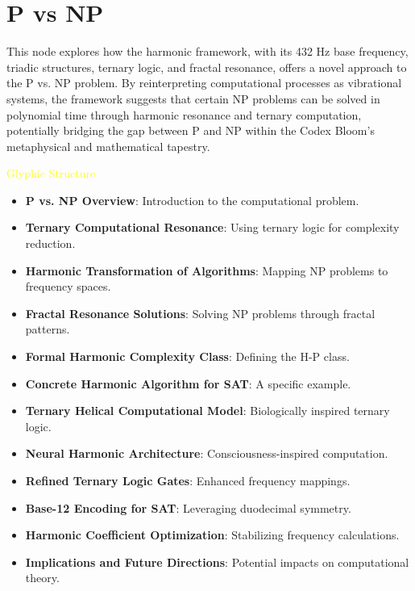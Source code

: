 
\section{P vs NP}
\label{sec:codex_p_vs_np}

This node explores how the harmonic framework, with its 432 Hz base frequency, triadic structures, ternary logic, and fractal resonance, offers a novel approach to the P vs. NP problem. By reinterpreting computational processes as vibrational systems, the framework suggests that certain NP problems can be solved in polynomial time through harmonic resonance and ternary computation, potentially bridging the gap between P and NP within the Codex Bloom’s metaphysical and mathematical tapestry.

\textcolor{yellow}{ Glyphic Structure } \\
\begin{itemize}
    \item \texttt{} \textbf{P vs. NP Overview}: Introduction to the computational problem.
    \item \texttt{} \textbf{Ternary Computational Resonance}: Using ternary logic for complexity reduction.
    \item \texttt{} \textbf{Harmonic Transformation of Algorithms}: Mapping NP problems to frequency spaces.
    \item \texttt{} \textbf{Fractal Resonance Solutions}: Solving NP problems through fractal patterns.
    \item \texttt{} \textbf{Formal Harmonic Complexity Class}: Defining the H-P class.
    \item \texttt{} \textbf{Concrete Harmonic Algorithm for SAT}: A specific example.
    \item \texttt{} \textbf{Ternary Helical Computational Model}: Biologically inspired ternary logic.
    \item \texttt{} \textbf{Neural Harmonic Architecture}: Consciousness-inspired computation.
    \item \texttt{} \textbf{Refined Ternary Logic Gates}: Enhanced frequency mappings.
    \item \texttt{} \textbf{Base-12 Encoding for SAT}: Leveraging duodecimal symmetry.
    \item \texttt{} \textbf{Harmonic Coefficient Optimization}: Stabilizing frequency calculations.
    \item \texttt{} \textbf{Implications and Future Directions}: Potential impacts on computational theory.
\end{itemize}

